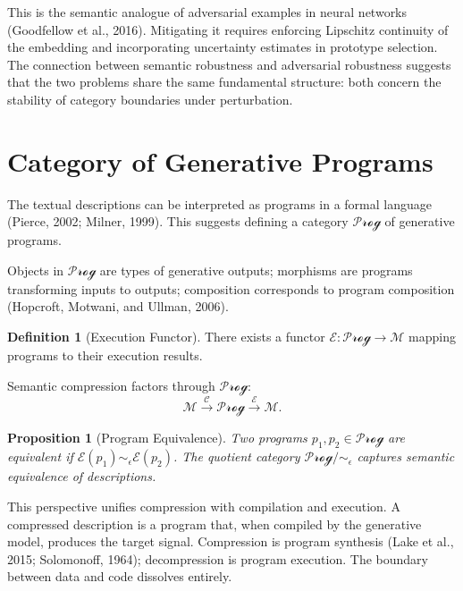 \documentclass[11pt,a4paper]{article}
\newtheorem{proposition}[theorem]{Proposition}
\theoremstyle{definition}
\newtheorem{definition}[theorem]{Definition}
\theoremstyle{remark}
\begin{document}
This is the semantic analogue of adversarial examples in neural networks (Goodfellow et al., 2016). Mitigating it requires enforcing Lipschitz continuity of the embedding and incorporating uncertainty estimates in prototype selection. The connection between semantic robustness and adversarial robustness suggests that the two problems share the same fundamental structure: both concern the stability of category boundaries under perturbation.

\section{Category of Generative Programs}
\label{sec:programs}

The textual descriptions can be interpreted as programs in a formal language (Pierce, 2002; Milner, 1999). This suggests defining a category $\mathcal{Prog}$ of generative programs.

Objects in $\mathcal{Prog}$ are types of generative outputs; morphisms are programs transforming inputs to outputs; composition corresponds to program composition (Hopcroft, Motwani, and Ullman, 2006).

\begin{definition}[Execution Functor]
There exists a functor $\mathcal{E} : \mathcal{Prog} \to \mathcal{M}$ mapping programs to their execution results.
\end{definition}

Semantic compression factors through $\mathcal{Prog}$:
\[
\mathcal{M} \xrightarrow{\mathcal{C}} \mathcal{Prog} \xrightarrow{\mathcal{E}} \mathcal{M}.
\]

\begin{proposition}[Program Equivalence]
Two programs $p_1, p_2 \in \mathcal{Prog}$ are equivalent if $\mathcal{E}(p_1) \sim_\epsilon \mathcal{E}(p_2)$. The quotient category $\mathcal{Prog}/\!\sim_\epsilon$ captures semantic equivalence of descriptions.
\end{proposition}

This perspective unifies compression with compilation and execution. A compressed description is a program that, when compiled by the generative model, produces the target signal. Compression is program synthesis (Lake et al., 2015; Solomonoff, 1964); decompression is program execution. The boundary between data and code dissolves entirely.
\end{document}
